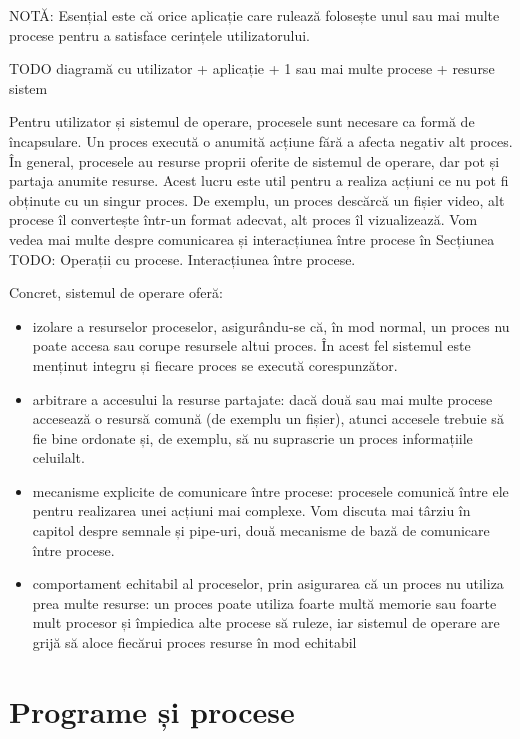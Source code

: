 NOTĂ: Esențial este că orice aplicație care rulează folosește unul sau mai multe procese pentru a satisface cerințele utilizatorului.

TODO diagramă cu utilizator + aplicație + 1 sau mai multe procese + resurse sistem

Pentru utilizator și sistemul de operare, procesele sunt necesare ca formă de
încapsulare. Un proces execută o anumită acțiune fără a afecta negativ alt
proces. În general, procesele au resurse proprii oferite de sistemul de operare,
dar pot și partaja anumite resurse. Acest lucru este util pentru a realiza
acțiuni ce nu pot fi obținute cu un singur proces. De exemplu, un proces
descărcă un fișier video, alt procese îl convertește într-un format adecvat, alt
proces îl vizualizează. Vom vedea mai multe despre comunicarea și interacțiunea
între procese în Secțiunea TODO: Operații cu procese. Interacțiunea între
procese.

Concret, sistemul de operare oferă:

\begin{itemize}
	\item izolare a resurselor proceselor, asigurându-se că, în mod normal,
		un proces nu poate accesa sau corupe resursele altui proces. În
		acest fel sistemul este menținut integru și fiecare proces se
		execută corespunzător.
	\item arbitrare a accesului la resurse partajate: dacă două sau mai
		multe procese accesează o resursă comună (de exemplu un fișier),
		atunci accesele trebuie să fie bine ordonate și, de exemplu, să
		nu suprascrie un proces informațiile celuilalt.
	\item mecanisme explicite de comunicare între procese: procesele
		comunică între ele pentru realizarea unei acțiuni mai complexe.
		Vom discuta mai târziu în capitol despre semnale și pipe-uri,
		două mecanisme de bază de comunicare între procese.
	\item comportament echitabil al proceselor, prin asigurarea că un proces
		nu utiliza prea multe resurse: un proces poate utiliza foarte
		multă memorie sau foarte mult procesor și împiedica alte procese
		să ruleze, iar sistemul de operare are grijă să aloce fiecărui
		proces resurse în mod echitabil
\end{itemize}

\section{Programe și procese}
\label{sec:procese-v-programe}

